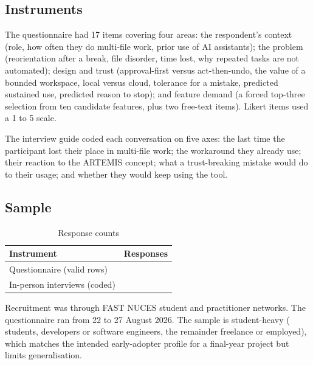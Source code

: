 \documentclass[11pt]{article}
\begin{document}
\subsection{Instruments}

The questionnaire had 17 items covering four areas: the respondent's context (role, how often
they do multi-file work, prior use of AI assistants); the problem (reorientation after a break,
file disorder, time lost, why repeated tasks are not automated); design and trust (approval-first
versus act-then-undo, the value of a bounded workspace, local versus cloud, tolerance for a
mistake, predicted sustained use, predicted reason to stop); and feature demand (a forced
top-three selection from ten candidate features, plus two free-text items). Likert items used a
1 to 5 scale.

The interview guide coded each conversation on five axes: the last time the participant lost
their place in multi-file work; the workaround they already use; their reaction to the ARTEMIS
concept; what a trust-breaking mistake would do to their usage; and whether they would keep
using the tool.

\subsection{Sample}

\begin{table}[H]
\centering
\caption{Response counts}
\begin{tabular}{@{}lr@{}}
\toprule
Instrument & Responses \\
\midrule
Questionnaire (valid rows) & \Nresp{} \\
In-person interviews (coded) & \Niv{} \\
\bottomrule
\end{tabular}
\end{table}

Recruitment was through FAST NUCES student and practitioner networks. The questionnaire ran
from 22 to 27 August 2026. The sample is student-heavy (\PctStudent{}\pctsym{} students,
\PctDeveloper{}\pctsym{} developers or software engineers, the remainder freelance or employed),
which matches the intended early-adopter profile for a final-year project but limits
generalisation.
\end{document}
